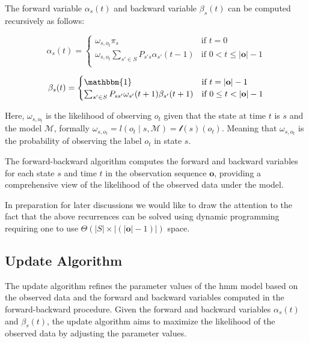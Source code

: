 The forward variable $\alpha_s(t)$ and backward variable $\beta_s(t)$ can be computed recursively as follows:

\begin{equation}
    \alpha_s(t) =
    \begin{cases}
        \omega_{s, o_t} \pi_s & \text{if } t = 0 \\
        \omega_{s, o_t} \sum_{s' \in S} P_{s's}\alpha_{s'}(t - 1) & \text{if } 0 < t \leq |\mathbf{o}| - 1 \\
    \end{cases}
    \label{eq:forward-recursive}
\end{equation}


\begin{equation}
    \beta_s(t) =
    \begin{cases}
        \mathbbm{1} & \text{if } t = |\mathbf{o}| - 1 \\
        \sum_{s' \in S} P_{ss'} \omega_{s'}(t + 1) \beta_{s'}(t + 1) & \text{if } 0 \leq t < |\mathbf{o}| - 1 \\
    \end{cases}
    \label{eq:backward-recursive}
\end{equation}


Here, $\omega_{s, o_t}$ is the likelihood of observing $o_t$ given that the state at time $t$ is $s$ and the model $\mathcal{M}$, formally $\omega_{s, o_t} = l(o_t \mid s, \mathcal{M}) = \mathscr{l}(s)(o_t)$.
Meaning that $\omega_{s, o_t}$ is the probability of observing the label $o_t$ in state $s$.

The forward-backward algorithm computes the forward and backward variables for each state $s$ and time $t$ in the observation sequence $\mathbf{o}$, providing a comprehensive view of the likelihood of the observed data under the model.

In preparation for later discussions we would like to draw the attention to the fact that the above recurrences can be solved using dynamic programming requiring one to use $\Theta(|S|\times|(|\mathbf{o}|-1)|)$ space.

\subsection{Update Algorithm}\label{subsec:update-algorithm}
The update algorithm refines the parameter values of the \gls{hmm} model based on the observed data and the forward and backward variables computed in the forward-backward procedure.
Given the forward and backward variables $\alpha_s(t)$ and $\beta_s(t)$, the update algorithm aims to maximize the likelihood of the observed data by adjusting the parameter values.

